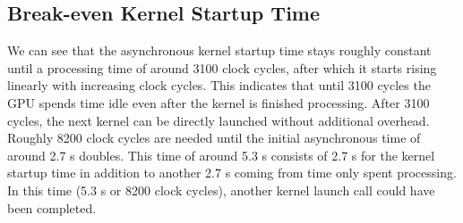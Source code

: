 \subsection{Break-even Kernel Startup Time}
We can see that the asynchronous kernel startup time stays roughly constant
until a processing time of around 3100 clock cycles, after which it starts
rising linearly with increasing clock cycles. This indicates that until 3100 cycles
the GPU spends time idle even after the kernel is finished processing. After 3100 cycles,
the next kernel can be directly launched without additional overhead. Roughly 8200 clock cycles are needed until the initial asynchronous time of around 2.7 s doubles.
This time of around 5.3 s consists of 2.7 s for the kernel startup time in addition to another 2.7 s coming from time only spent processing.
In this time (5.3 s or 8200 clock cycles), another kernel launch call could have been completed.

